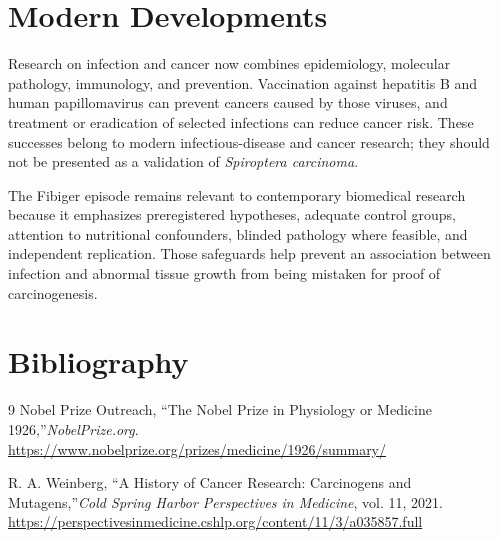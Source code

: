 \section{Modern Developments}

Research on infection and cancer now combines epidemiology, molecular pathology, immunology, and prevention. Vaccination against hepatitis B and human papillomavirus can prevent cancers caused by those viruses, and treatment or eradication of selected infections can reduce cancer risk. These successes belong to modern infectious-disease and cancer research; they should not be presented as a validation of \emph{Spiroptera carcinoma}.

The Fibiger episode remains relevant to contemporary biomedical research because it emphasizes preregistered hypotheses, adequate control groups, attention to nutritional confounders, blinded pathology where feasible, and independent replication. Those safeguards help prevent an association between infection and abnormal tissue growth from being mistaken for proof of carcinogenesis.

\section{Bibliography}

\begin{thebibliography}{9}
Nobel Prize Outreach, ``The Nobel Prize in Physiology or Medicine 1926,''\emph{NobelPrize.org}.\newline
\url{https://www.nobelprize.org/prizes/medicine/1926/summary/}

R. A. Weinberg, ``A History of Cancer Research: Carcinogens and Mutagens,''\emph{Cold Spring Harbor Perspectives in Medicine}, vol. 11, 2021.\newline
\url{https://perspectivesinmedicine.cshlp.org/content/11/3/a035857.full}
\end{thebibliography}
